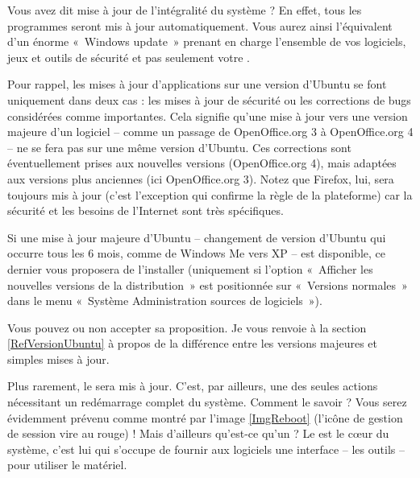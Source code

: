 Vous avez dit mise à jour de l'intégralité du système ? En effet, tous les programmes seront mis à jour automatiquement. Vous aurez ainsi l'équivalent d'un énorme «~Windows update~» prenant en charge l'ensemble de vos logiciels, jeux et outils de sécurité et pas seulement votre .\par
Pour rappel, les mises à jour d’applications sur une version d’Ubuntu se font uniquement dans deux cas : les mises à jour de sécurité ou les corrections de bugs considérées comme importantes. Cela signifie qu'une mise à jour vers une version majeure d'un logiciel -- comme un passage de OpenOffice.org 3 à OpenOffice.org 4 -- ne se fera pas sur une même version d'Ubuntu. Ces corrections sont éventuellement prises aux nouvelles versions (OpenOffice.org 4), mais adaptées aux versions  plus anciennes (ici OpenOffice.org 3). Notez que Firefox, lui, sera toujours mis à jour (c'est l'exception qui confirme la règle de la plateforme) car la sécurité et les besoins de l'Internet sont très spécifiques.\par
Si une mise à jour majeure d'Ubuntu -- changement de version d'Ubuntu qui occurre tous les 6 mois, comme de Windows Me vers XP -- est disponible, ce dernier vous proposera de l'installer (uniquement si l'option «~Afficher les nouvelles versions de la distribution~» est positionnée sur «~Versions normales~» dans le menu «~Système \FlecheDroite Administration \FlecheDroite sources de logiciels~»).\par
Vous pouvez ou non accepter sa proposition. Je vous renvoie à la section \ref{RefVersionUbuntu} à propos de la différence entre les versions majeures et simples mises à jour.\par
Plus rarement, le  sera mis à jour. C'est, par ailleurs, une des seules actions nécessitant un redémarrage complet du système. Comment le savoir ? Vous serez évidemment prévenu comme montré par l'image \ref{ImgReboot} (l'icône de gestion de session vire au rouge) ! Mais d'ailleurs qu'est-ce qu'un  ? Le  est le cœur du système, c'est lui qui s'occupe de fournir aux logiciels une interface -- les outils -- pour utiliser le matériel.\par
{}
